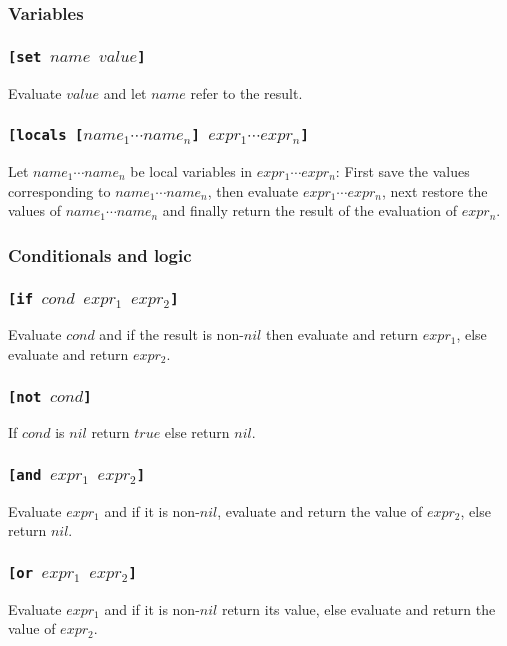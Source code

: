 \documentclass[11pt]{report}
\begin{document}
\subsubsection{Variables}
\subsubsection*{\tt{[set }$name$ $value$\tt{]}}
Evaluate $value$ and let $name$ refer to the result.

\subsubsection*{\tt{[locals [}$name_1 \cdots name_n$\tt{]} $expr_1 \cdots expr_n$\tt{]}}
Let $name_1 \cdots name_n$ be local variables in $expr_1 \cdots expr_n$: First save the values corresponding to $name_1 \cdots name_n$, then evaluate $expr_1 \cdots expr_n$, next restore the values of $name_1 \cdots name_n$ and finally return the result of the evaluation of $expr_n$.

\subsubsection{Conditionals and logic}
\subsubsection*{\tt{[if }$cond$ $expr_1$ $expr_2$\tt{]}}
Evaluate $cond$ and if the result is non-$nil$ then evaluate and return $expr_1$, else evaluate and return $expr_2$.

\subsubsection*{\tt{[not }$cond$\tt{]}}
If $cond$ is $nil$ return $true$ else return $nil$.

\subsubsection*{\tt{[and }$expr_1$ $expr_2$\tt{]}}
Evaluate $expr_1$ and if it is non-$nil$, evaluate and return the value of $expr_2$, else return $nil$.

\subsubsection*{\tt{[or }$expr_1$ $expr_2$\tt{]}}
Evaluate $expr_1$ and if it is non-$nil$ return its value, else evaluate and return the value of $expr_2$.
\end{document}
